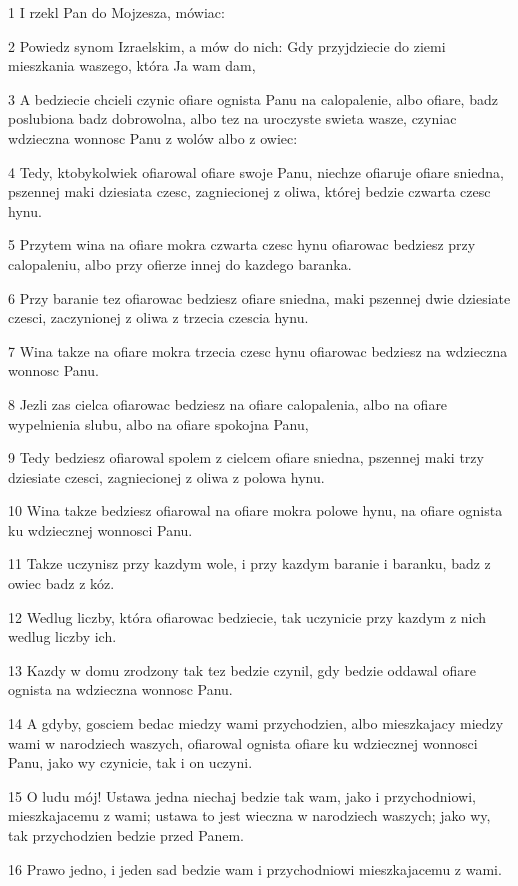 \par 1 I rzekl Pan do Mojzesza, mówiac:
\par 2 Powiedz synom Izraelskim, a mów do nich: Gdy przyjdziecie do ziemi mieszkania waszego, która Ja wam dam,
\par 3 A bedziecie chcieli czynic ofiare ognista Panu na calopalenie, albo ofiare, badz poslubiona badz dobrowolna, albo tez na uroczyste swieta wasze, czyniac wdzieczna wonnosc Panu z wolów albo z owiec:
\par 4 Tedy, ktobykolwiek ofiarowal ofiare swoje Panu, niechze ofiaruje ofiare sniedna, pszennej maki dziesiata czesc, zagniecionej z oliwa, której bedzie czwarta czesc hynu.
\par 5 Przytem wina na ofiare mokra czwarta czesc hynu ofiarowac bedziesz przy calopaleniu, albo przy ofierze innej do kazdego baranka.
\par 6 Przy baranie tez ofiarowac bedziesz ofiare sniedna, maki pszennej dwie dziesiate czesci, zaczynionej z oliwa z trzecia czescia hynu.
\par 7 Wina takze na ofiare mokra trzecia czesc hynu ofiarowac bedziesz na wdzieczna wonnosc Panu.
\par 8 Jezli zas cielca ofiarowac bedziesz na ofiare calopalenia, albo na ofiare wypelnienia slubu, albo na ofiare spokojna Panu,
\par 9 Tedy bedziesz ofiarowal spolem z cielcem ofiare sniedna, pszennej maki trzy dziesiate czesci, zagniecionej z oliwa z polowa hynu.
\par 10 Wina takze bedziesz ofiarowal na ofiare mokra polowe hynu, na ofiare ognista ku wdziecznej wonnosci Panu.
\par 11 Takze uczynisz przy kazdym wole, i przy kazdym baranie i baranku, badz z owiec badz z kóz.
\par 12 Wedlug liczby, która ofiarowac bedziecie, tak uczynicie przy kazdym z nich wedlug liczby ich.
\par 13 Kazdy w domu zrodzony tak tez bedzie czynil, gdy bedzie oddawal ofiare ognista na wdzieczna wonnosc Panu.
\par 14 A gdyby, gosciem bedac miedzy wami przychodzien, albo mieszkajacy miedzy wami w narodziech waszych, ofiarowal ognista ofiare ku wdziecznej wonnosci Panu, jako wy czynicie, tak i on uczyni.
\par 15 O ludu mój! Ustawa jedna niechaj bedzie tak wam, jako i przychodniowi, mieszkajacemu z wami; ustawa to jest wieczna w narodziech waszych; jako wy, tak przychodzien bedzie przed Panem.
\par 16 Prawo jedno, i jeden sad bedzie wam i przychodniowi mieszkajacemu z wami.
